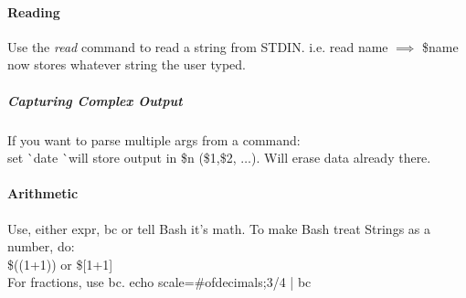\documentclass[12 pt]{article}
\begin{document}
		\paragraph{Reading} Use the \textit{read} command to read a string from STDIN. i.e. read name $\implies$ \$name now stores whatever string the user typed.
		\subparagraph{Capturing Complex Output} If you want to parse multiple args from a command: 
		\\ set \` \ date \` \ will store output in \$n (\$1,\$2, $\ldots$). Will erase data already there.
		\paragraph{Arithmetic} Use, either expr, bc or tell Bash it's math. To make Bash treat Strings as a number, do: 
		\\ \$((1+1)) or \$[1+1]
		\\ For fractions, use bc. echo \textquotedbl scale=\#ofdecimals;3/4 \textquotedbl | bc
\end{document}

